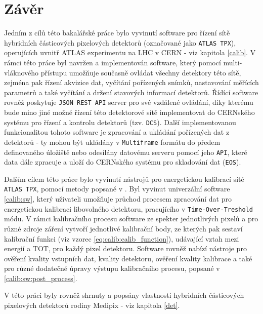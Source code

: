 

\chapter{Závěr}
Jedním z cílů této bakalářské práce bylo vyvinutí software pro řízení sítě hybridních částicových pixelových detektorů (označované jako \texttt{ATLAS TPX}), operujících uvnitř ATLAS experimentu na LHC v CERN - viz kapitola \ref{calib}. V rámci této práce byl navržen a implementován software, který pomocí multi-vláknového přístupu umožňuje současně ovládat všechny detektory této sítě, zejména pak řízení akvizice dat, vyčítání pořízených snímků, nastavování měřících parametrů a také vyčítání a držení stavových informací detektorů. Řídící software rovněž poskytuje \texttt{JSON REST API} server pro své vzdálené ovládání, díky kterému bude mino jiné možné řízení této detektorové sítě implementovat do CERNského systému pro řízení a kontrolu detektorů (tzv. \texttt{DCS}). Další implementovanou funkcionalitou tohoto software je zpracování a ukládání pořízených dat z detektorů - ty mohou být ukládány v \texttt{Multiframe} formátu do předem definovaného úložiště nebo odesílány datovému serveru pomocí jeho \texttt{API}, které data dále zpracuje a uloží do CERNského systému pro skladování dat (\texttt{EOS}).

Dalším cílem této práce bylo vyvinutí nástrojů pro energetickou kalibrací sítě \texttt{ATLAS TPX}, pomocí metody popsané v \cite{Jakubek2011S262}. Byl vyvinut univerzální software \ref{calib:sw}, který uživateli umožňuje průchod procesem zpracování dat pro energetickou kalibraci libovolného detektoru, pracujícího v \texttt{Time-Over-Treshold} módu. V rámci kalibračního procesu software ze spekter jednotlivých pixelů a pro různé zdroje záření vytvoří jednotlivé kalibrační body, ze kterých pak sestaví kalibrační funkci (viz vzorec \ref{eq:calib:calib_function}), udávající vztah mezi energií a TOT, pro každý pixel detektoru. Software rovněž nabízí nástroje pro ověření kvality vstupních dat, kvality detektoru, ověření kvality kalibrace a také pro různé dodatečné úpravy výstupu kalibračního procesu, popsané v \ref{calib:sw:post_process}.

V této práci byly rovněž shrnuty a popsány vlastnosti hybridních částicových pixelových detektorů rodiny Medipix - viz kapitola \ref{det}.